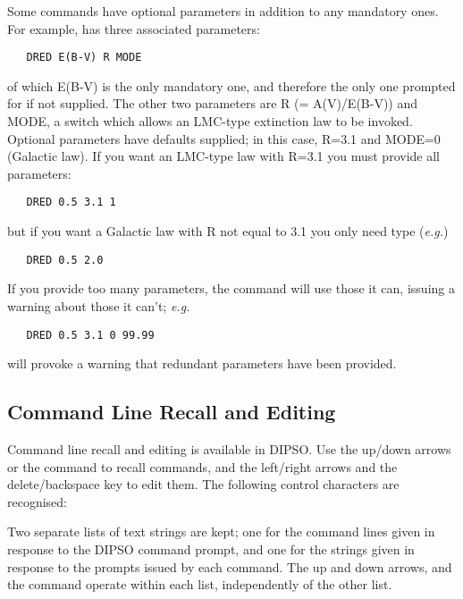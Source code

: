 Some commands have optional parameters in addition to any mandatory
ones. For example,   has three associated parameters:

\begin{verbatim}
   DRED E(B-V) R MODE
\end{verbatim}

of which E(B-V) is the only mandatory one, and therefore the only one
prompted for if not supplied. The other two parameters are R (=
A(V)/E(B-V)) and MODE, a switch which allows an LMC-type extinction
law to be invoked. Optional parameters have defaults supplied; in this
case, R=3.1 and MODE=0 (Galactic law). If you want an LMC-type law
with R=3.1 you must provide all parameters:

\begin{verbatim}
   DRED 0.5 3.1 1
\end{verbatim}

but if you want a Galactic law with R not equal to 3.1 you only need
type ({\em e.g.})

\begin{verbatim}
   DRED 0.5 2.0
\end{verbatim}

If you provide too many parameters, the command will use those it can,
issuing a warning about those it can't; {\em e.g.}

\begin{verbatim}
   DRED 0.5 3.1 0 99.99
\end{verbatim}

will provoke a warning that redundant parameters have been provided.

\subsection{Command Line Recall and Editing}
Command line recall and editing is available in DIPSO. Use the up/down
arrows or the   command to recall commands, and the left/right
arrows and the delete/backspace key to edit them. The following control
characters are recognised:

\begin{dipdesc}
\end{dipdesc}

Two separate lists of text strings are kept; one for the command lines
given in response to the DIPSO command prompt, and one for the strings
given in response to the prompts issued by each command. The up and down
arrows, and the   command operate within each list, independently
of the other list.

